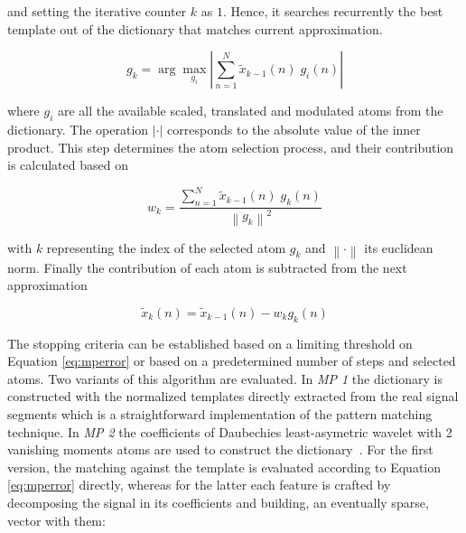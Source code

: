 \noindent and setting the iterative counter $k$ as $1$. Hence, it searches recurrently the best template out of the dictionary  that matches current approximation.  

\begin{equation}
g_{k} = \arg \max_{g_{i}} \left\lvert  \sum_{n=1}^{N} \tilde{x}_{k-1}(n) \; g_{i}(n) \right\rvert 
\label{eq:mp3}
\end{equation}

\noindent where $g_{i}$ are all the available scaled, translated and modulated atoms from the dictionary.  The operation $\left\lvert \cdot \right\rvert$ corresponds to the absolute value of the inner product.  This step determines the atom selection process, and their contribution is calculated based on 



\begin{equation}
w_{k} =  \frac{\sum_{n=1}^{N} \tilde{x}_{k-1}(n) \; g_{k}(n)}{  {\left\lVert  g_{k} \right\rVert}^{2} }
\label{eq:mp4}
\end{equation}

\noindent with $k$ representing the index of the selected atom $g_{k}$ and $\left\lVert \cdot \right\rVert$ its euclidean norm.  Finally the contribution of each atom is subtracted from the next approximation~\cite{Cohen2014,Sanei2007, Mallat1993}

\begin{equation}
\tilde{x}_{k}(n)=  \tilde{x}_{k-1}(n) - w_{k} g_{k} (n)
\label{eq:mp5}
\end{equation}

The stopping criteria can be established based on a limiting threshold on Equation \ref{eq:mperror} or based on a predetermined number of steps and selected atoms.  Two variants of this algorithm are evaluated. In \textit{MP 1} the dictionary is constructed with the normalized templates directly extracted from the real signal segments which is a straightforward implementation of the pattern matching technique.  In \textit{MP 2} the coefficients of Daubechies least-asymetric wavelet with 2 vanishing moments atoms are used to construct the dictionary~\cite{Vareka2012}.  For the first version, the matching against the template is evaluated according to Equation \ref{eq:mperror} directly, whereas for the latter each feature is crafted by decomposing the signal in its coefficients and building, an eventually sparse, vector with them:


